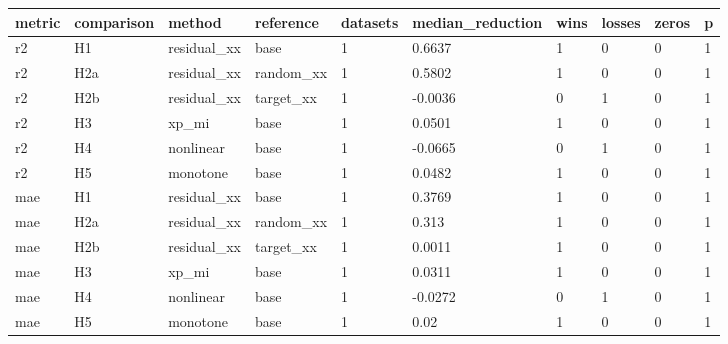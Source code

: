 \begin{tabular}{llllllllll}
\toprule
metric & comparison & method & reference & datasets & median\_reduction & wins & losses & zeros & p \\
\midrule
r2 & H1 & residual\_xx & base & 1 & 0.6637 & 1 & 0 & 0 & 1 \\
r2 & H2a & residual\_xx & random\_xx & 1 & 0.5802 & 1 & 0 & 0 & 1 \\
r2 & H2b & residual\_xx & target\_xx & 1 & -0.0036 & 0 & 1 & 0 & 1 \\
r2 & H3 & xp\_mi & base & 1 & 0.0501 & 1 & 0 & 0 & 1 \\
r2 & H4 & nonlinear & base & 1 & -0.0665 & 0 & 1 & 0 & 1 \\
r2 & H5 & monotone & base & 1 & 0.0482 & 1 & 0 & 0 & 1 \\
mae & H1 & residual\_xx & base & 1 & 0.3769 & 1 & 0 & 0 & 1 \\
mae & H2a & residual\_xx & random\_xx & 1 & 0.313 & 1 & 0 & 0 & 1 \\
mae & H2b & residual\_xx & target\_xx & 1 & 0.0011 & 1 & 0 & 0 & 1 \\
mae & H3 & xp\_mi & base & 1 & 0.0311 & 1 & 0 & 0 & 1 \\
mae & H4 & nonlinear & base & 1 & -0.0272 & 0 & 1 & 0 & 1 \\
mae & H5 & monotone & base & 1 & 0.02 & 1 & 0 & 0 & 1 \\
\bottomrule
\end{tabular}
